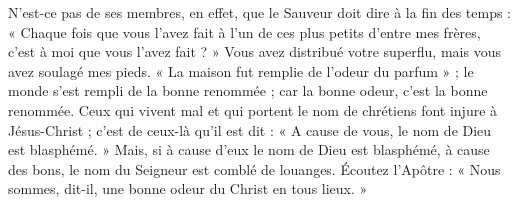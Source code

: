 N’est-ce pas de ses membres, en effet, que le Sauveur doit dire à la fin des temps : « Chaque fois que vous l’avez fait à l’un de ces plus petits d’entre mes frères, c’est à moi que vous l’avez fait ? » Vous avez distribué votre superflu, mais vous avez soulagé mes pieds. « La maison fut remplie de l’odeur du parfum » ; le monde s’est rempli de la bonne renommée ; car la bonne odeur, c’est la bonne renommée. Ceux qui vivent mal et qui portent le nom de chrétiens font injure à Jésus-Christ ; c’est de ceux-là qu’il est dit : « A cause de vous, le nom de Dieu est blasphémé. » Mais, si à cause d’eux le nom de Dieu est blasphémé, à cause des bons, le nom du Seigneur est comblé de louanges. Écoutez l’Apôtre : « Nous sommes, dit-il, une bonne odeur du Christ en tous lieux. »
